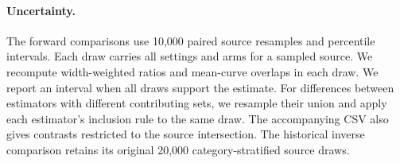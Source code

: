 \paragraph{Uncertainty.}
The forward comparisons use 10,000 paired source resamples and percentile intervals. Each draw carries all settings and arms for a sampled source. We recompute width-weighted ratios and mean-curve overlaps in each draw. We report an interval when all draws support the estimate. For differences between estimators with different contributing sets, we resample their union and apply each estimator's inclusion rule to the same draw. The accompanying CSV also gives contrasts restricted to the source intersection. The historical inverse comparison retains its original 20,000 category-stratified source draws.
